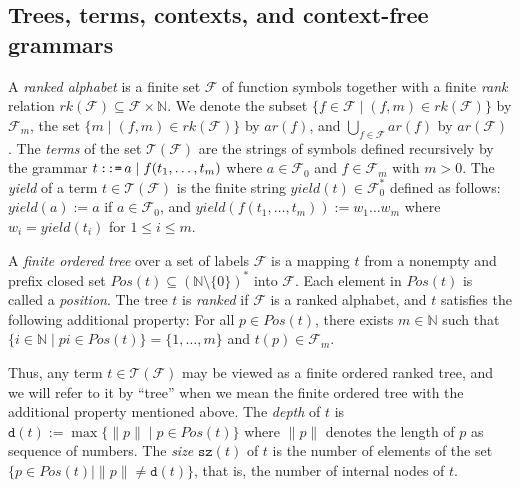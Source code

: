 \documentclass[preprint,12pt,english]{article}
\def\sz{\mathtt{sz}}
\def\cF{\mathcal{F}}
\def\cT{\mathcal{T}}
\def\depth{\mathtt{d}}
\begin{document}
\subsection*{Trees, terms, contexts, and context-free grammars}
A {\em ranked alphabet} is a finite set $\cF$ of function symbols  together with a finite {\em rank} relation $rk(\cF)\subseteq \cF\times \mathbb{N}.$ We denote the subset $\{f\in\cF\mid (f,m)\in rk(\cF)\}$ by $\cF_m$,  the set $\{m\mid (f,m)\in rk(\cF)\}$ by $ar(f)$, and  $\bigcup_{f\in \cF}ar(f)$ by $ar(\cF)$.
The {\em terms} of the set $\cT(\cF)$ are the strings of symbols defined recursively by the grammar
$t\mathop{\mbox{\tt{::=}}}a\mid f(t_1,\ldots,t_m)$
where $a\in\cF_0$ and $f\in\cF_m$ with $m>0$. The {\em yield} of a term $t\in\cT(\cF)$ is the finite string $yield(t)\in\cF_0^*$ defined as follows: $yield(a):=a$ if $a\in\cF_0$, and $yield(f(t_1,\ldots,t_m)):=w_1\ldots w_m$ where $w_i=yield(t_i)$ for $1\leq i\leq m.$

A {\em finite ordered tree} over a set of labels $\cF$ is a mapping $t$ from a nonempty and prefix closed set $Pos(t)\subseteq(\mathbb{N}\setminus\{0\})^*$ into $\cF$. Each element in $Pos(t)$ is called a {\em position}. The tree $t$ is {\em ranked} if $\cF$ is a ranked alphabet, and $t$ satisfies the following additional property:
For all $p\in Pos(t)$, there exists $m\in\mathbb{N}$ such that  $\{i\in\mathbb{N}\mid pi\in Pos(t)\}=\{1,\ldots,m\}$ and  $t(p)\in \cF_m$.

Thus, any term $t\in \cT(\cF)$ may be viewed as a finite ordered ranked tree, and we will  refer to it by ``tree'' when we mean the finite ordered tree with the additional property mentioned above. The {\em depth} of $t$ is $\depth(t):=\max \{\|p\|\mid p\in Pos(t)\}$ where $\|p\|$ denotes the length of $p$ as sequence of numbers. The {\em size} $\sz(t)$ of  $t$ is the number of elements of the set $\{p\in Pos(t)\mid \| p\| \neq\depth(t)\}$, that is, the number of internal nodes of $t$.
\end{document}
